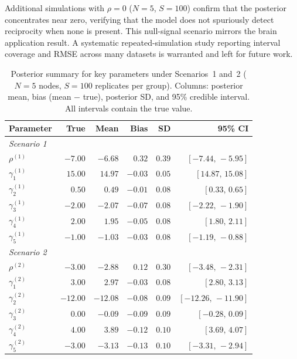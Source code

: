 \documentclass[12pt]{article}
\begin{document}
Additional simulations with $\rho = 0$ ($N = 5$, $S = 100$) confirm that the
posterior concentrates near zero, verifying that the model does not spuriously
detect reciprocity when none is present.  This null-signal scenario mirrors
the brain application result.  A systematic repeated-simulation study
reporting interval coverage and RMSE across many datasets is warranted and
left for future work.

\begin{table}[htb]
\caption{Posterior summary for key parameters under Scenarios~1 and~2
  ($N=5$ nodes, $S=100$ replicates per group).  Columns: posterior mean,
  bias (mean $-$ true), posterior SD, and 95\% credible interval.  All
  intervals contain the true value.}
\label{tab:sim}
\begin{center}
\begin{tabular}{lrrrrr}
\toprule
Parameter & True & Mean & Bias & SD & 95\% CI \\
\midrule
\multicolumn{6}{l}{\textit{Scenario 1}} \\
$\rho^{(1)}$   & $-7.00$ & $-6.68$ & $0.32$ & $0.39$ & $[-7.44,\,-5.95]$ \\
$\gamma_1^{(1)}$ & $15.00$ & $14.97$ & $-0.03$ & $0.05$ & $[14.87,\,15.08]$ \\
$\gamma_2^{(1)}$ & $0.50$  & $0.49$  & $-0.01$ & $0.08$ & $[0.33,\,0.65]$ \\
$\gamma_3^{(1)}$ & $-2.00$ & $-2.07$ & $-0.07$ & $0.08$ & $[-2.22,\,-1.90]$ \\
$\gamma_4^{(1)}$ & $2.00$  & $1.95$  & $-0.05$ & $0.08$ & $[1.80,\,2.11]$ \\
$\gamma_5^{(1)}$ & $-1.00$ & $-1.03$ & $-0.03$ & $0.08$ & $[-1.19,\,-0.88]$ \\
\midrule
\multicolumn{6}{l}{\textit{Scenario 2}} \\
$\rho^{(2)}$   & $-3.00$ & $-2.88$ & $0.12$ & $0.30$ & $[-3.48,\,-2.31]$ \\
$\gamma_1^{(2)}$ & $3.00$  & $2.97$  & $-0.03$ & $0.08$ & $[2.80,\,3.13]$ \\
$\gamma_2^{(2)}$ & $-12.00$ & $-12.08$ & $-0.08$ & $0.09$ & $[-12.26,\,-11.90]$ \\
$\gamma_3^{(2)}$ & $0.00$  & $-0.09$ & $-0.09$ & $0.09$ & $[-0.28,\,0.09]$ \\
$\gamma_4^{(2)}$ & $4.00$  & $3.89$  & $-0.12$ & $0.10$ & $[3.69,\,4.07]$ \\
$\gamma_5^{(2)}$ & $-3.00$ & $-3.13$ & $-0.13$ & $0.10$ & $[-3.31,\,-2.94]$ \\
\bottomrule
\end{tabular}
\end{center}
\end{table}
\end{document}
